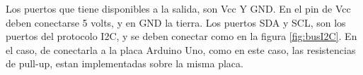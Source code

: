 Los puertos que tiene disponibles a la salida, son Vcc Y GND. En el pin de Vcc deben conectarse 5 volts, y en GND la tierra. Los puertos SDA y SCL, son los puertos del protocolo I2C, y se deben conectar como en la figura \ref{fig:busI2C}. En el caso, de conectarla a la placa Arduino Uno, como en este caso, las resistencias de pull-up, estan implementadas sobre la misma placa. 





